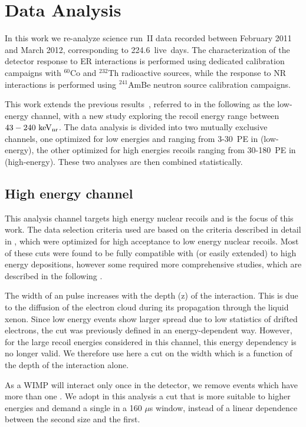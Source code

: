 \section{Data Analysis}
\label{sec:Analysis}
In this work we re-analyze science run~II data recorded between February 2011 and March 2012, 
corresponding to 224.6~live~days. The characterization of the detector response to ER interactions is performed using dedicated calibration campaigns with $^{60}$Co and $^{232}$Th radioactive sources, while the response to NR interactions is performed using $^{241}$AmBe neutron source calibration campaigns.
 
This work extends the previous results~\cite{xe100_run10_si,xe100_run_combination}, referred to in the following as the low-energy channel, with a new study exploring the recoil energy range between $43-240~\mathrm{keV_\mathrm{nr}}$. 
The data analysis is divided into two mutually exclusive channels, one optimized for low energies and ranging from 3-30~PE in \cSi{} (low-energy), 
the other optimized for high energies recoils ranging from 30-180~PE in \cSi{} (high-energy). These two analyses are then combined statistically. 


\subsection{High energy channel}
\label{subsubsec:HighE}
This analysis channel targets high energy nuclear recoils and is the focus of this work. The data selection criteria used are based on the criteria described in detail in \cite{Aprile:2012vw}, which were optimized for high acceptance to low energy nuclear recoils. Most of these cuts were found to be fully compatible with (or easily extended) to high energy depositions, however some required more comprehensive studies, which are described in the following . 

The width of an \Sii{} pulse increases with the depth (z) of the interaction. This is due to the diffusion of the electron cloud during its propagation
through the liquid xenon. Since low energy \Sii{} events show larger spread
due to low statistics of drifted electrons, the cut was previously defined in an energy-dependent way. However, for the large recoil energies considered in this channel, this energy dependency is no longer valid. We therefore use here a cut on the \Sii{} width which is a function of the depth of the interaction alone. 

As a WIMP will interact only once in the detector, we remove events which have more than one \Sii{}. We adopt in this analysis a cut that is more suitable to higher energies and demand a single \Sii{} in a 160 $\mu$s window, instead of a linear dependence between the second \Sii{} size and the first. 

